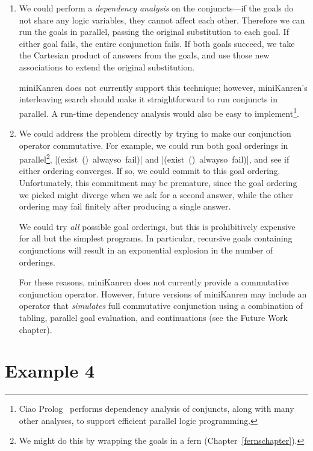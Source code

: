 \begin{enumerate}
\item We could perform a \emph{dependency analysis} on the
conjuncts---if the goals do not share any logic variables, they cannot
affect each other.  Therefore we can run the goals in parallel,
passing the original substitution to each goal.  If either goal fails,
the entire conjunction fails.  If both goals succeed, we take the
Cartesian product of answers from the goals, and use those new
associations to extend the original substitution.

miniKanren does not currently support this technique; however,
miniKanren's interleaving search should make it straightforward to run
conjuncts in parallel.  A run-time dependency analysis would also be
easy to implement\footnote{Ciao Prolog~\cite{Hermenegildo95strictand}
  performs dependency analysis of conjuncts, along with many other
  analyses, to support efficient parallel logic programming.}.

\item We could address the problem directly by trying to make our
conjunction operator commutative.  For example, we could run both goal
orderings in parallel\footnote{We might
do this by wrapping the goals in a
fern (Chapter~\ref{fernschapter}).}, \mbox{\scheme|(exist () alwayso fail)|} and
\mbox{\scheme|(exist () alwayso fail)|}, and see if either ordering
converges.  If so, we could commit to this goal ordering.
Unfortunately, this commitment may be premature, since the goal
ordering we picked might diverge when we ask for a second answer,
while the other ordering may fail finitely after producing a single
answer.

We could try \emph{all} possible goal orderings, but this is
prohibitively expensive for all but the simplest programs.  In
particular, recursive goals containing conjunctions will result in an
exponential explosion in the number of orderings.

For these reasons, miniKanren does not currently provide a
commutative conjunction operator.  However, future versions of
miniKanren may include an operator that \emph{simulates} full
commutative conjunction using a combination of tabling, parallel goal
evaluation, and continuations (see the Future Work chapter).

\end{enumerate}


\section*{Example 4}

